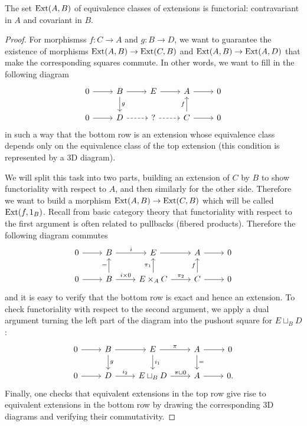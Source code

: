 \begin{thm}
    The set $\operatorname{Ext}(A,B)$ of equivalence classes of extensions is functorial: contravariant in $A$ and covariant in $B$.
\end{thm}
\begin{proof}
    For morphismss $f:C\to A$ and $g:B\to D$, we want to guarantee the existence of morphisms $\operatorname{Ext}(A,B)\to \operatorname{Ext}(C,B)$ and $\operatorname{Ext}(A,B)\to \operatorname{Ext}(A,D)$ that make the corresponding squares commute. In other words, we want to fill in the following diagram
    \[\begin{tikzcd}
        0\arrow[r] & B\arrow[r]\arrow[d,"g"] & E \arrow[r] & A\arrow[r] & 0 \\
        0\arrow[r] & D\arrow[r,dashed]       & ?  \arrow[r,dashed]    & C\arrow[r] \arrow[u,"f"] & 0
    \end{tikzcd}\]
    in such a way that the bottom row is an extension whose equivalence class depends only on the equivalence class of the top extension (this condition is represented by a 3D diagram).

    We will split this task into two parts, building an extension of $C$ by $B$ to show functoriality with respect to $A$, and then similarly for the other side. Therefore we want to build  a morphism $\operatorname{Ext}(A,B)\to \operatorname{Ext}(C,B)$ which will be called $\operatorname{Ext}(f,1_B)$. Recall from basic category theory that functoriality with respect to the first argument is often related to pullbacks (fibered products). Therefore the following diagram commutes
    \[\begin{tikzcd}
        0\arrow[r] & B\arrow[r,"i"] & E \arrow[r] & A\arrow[r] & 0 \\
        0\arrow[r] & B\arrow[r,"i\times 0"]\arrow[u,"="]       & E\times_A C  \arrow[r,"\pi_2"]\arrow[u,"\pi_1"]    & C\arrow[r] \arrow[u,"f"] & 0
    \end{tikzcd}\]
    and it is easy to verify that the bottom row is exact and hence an extension. To check functoriality with respect to the second argument, we apply a dual argument turning the left part of the diagram into the pushout square for $E\sqcup_B D$:
    \[\begin{tikzcd}
        0\arrow[r] & B\arrow[r]\arrow[d,"g"] & E \arrow[r,"\pi"]\arrow[d,"i_1"] & A\arrow[r]\arrow[d,"="] & 0 \\
        0\arrow[r] & D\arrow[r,"i_2"]      & E\sqcup_B D  \arrow[r,"\pi\sqcup 0"] & A\arrow[r] & 0.
    \end{tikzcd}\]
    Finally, one checks that equivalent extensions in the top row give rise to equivalent extensions in the bottom row by drawing the corresponding 3D diagrams and verifying their commutativity.
\end{proof}

